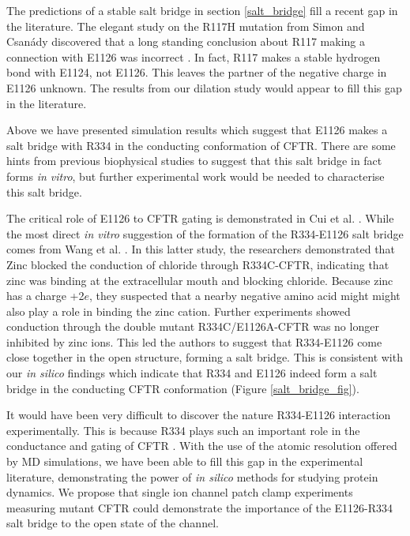 The predictions of a stable salt bridge in section \ref{salt_bridge} fill a recent gap in the literature. The elegant study on the R117H mutation from Simon and Csanády \cite{simon2021} discovered that a long standing conclusion about R117 making a connection with E1126 was incorrect \cite{cui2014}. In fact, R117 makes a stable hydrogen bond with E1124, not E1126. This leaves the partner of the negative charge in E1126 unknown. The results from our dilation study would appear to fill this gap in the literature. 

Above we have presented simulation results which suggest that E1126 makes a salt bridge with R334 in the conducting conformation of CFTR. There are some hints from previous biophysical studies to suggest that this salt bridge in fact forms \textit {in vitro}, but further experimental work would be needed to characterise this salt bridge.

The critical role of E1126 to CFTR gating is demonstrated in Cui et al. \cite{cui2014}. While the most direct \textit{in vitro} suggestion of the formation of the R334-E1126 salt bridge comes from Wang et al. \cite{wang2016}. In this latter study, the researchers demonstrated that Zinc blocked the conduction of chloride through R334C-CFTR, indicating that zinc was binding at the extracellular mouth and blocking chloride. Because zinc has a charge +2$e$, they suspected that a nearby negative amino acid might might also play a role in binding the zinc cation. Further experiments showed conduction through the double mutant R334C/E1126A-CFTR was no longer inhibited by zinc ions. This led the authors to suggest that R334-E1126 come close together in the open structure, forming a salt bridge. This is consistent with our \textit{in silico} findings which indicate that R334 and E1126 indeed form a salt bridge in the conducting CFTR conformation (Figure \ref{salt_bridge_fig}).  

It would have been very difficult to discover the nature R334-E1126 interaction experimentally. This is because R334 plays such an important role in the conductance and gating of CFTR \cite{zhang2005,zhang2005a, gong2004, wang2012}. With the use of the atomic resolution offered by MD simulations, we have been able to fill this gap in the experimental literature, demonstrating the power of \textit{in silico} methods for studying protein dynamics. We propose that single ion channel patch clamp experiments measuring mutant CFTR could demonstrate the importance of the E1126-R334 salt bridge to the open state of the channel. 

